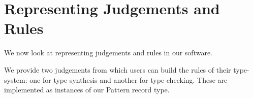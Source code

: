\section{Representing Judgements and Rules}


We now look at representing judgements and rules in our software.

We provide two judgements from which users can build the rules of their
type-system: one for type synthesis and another for type checking. These
are implemented as instances of our Pattern record type.

